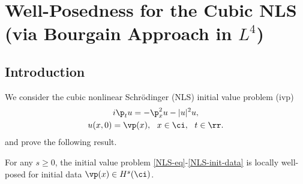 \chapter{Well-Posedness for the Cubic NLS (via Bourgain Approach in $L^{4}$) }
				  \section{Introduction}
				  We consider the cubic nonlinear Schr\"{o}dinger (NLS) 
				  initial value problem (ivp)
%
%
\begin{gather}
	\label{NLS-eq}
		i \p_t u = - \p_x^2 u - |u|^{2} u,
		\\
		\label{NLS-init-data}
		u(x,0) = \vp(x), \ \ x \in \ci, \ \ t \in \rr.
\end{gather}
%
%
and prove the following result.
%
%
%
%
%
%
%
%
%
%
\begin{theorem}
	\label{thm:main}
	For any $s \ge 0$, the initial value problem 
	\eqref{NLS-eq}-\eqref{NLS-init-data} is locally well-posed for 
	initial data $\vp(x) \in H^s(\ci)$.
%
%
\end{theorem} 
%
%
%
%
%
%
%
%
%
%
